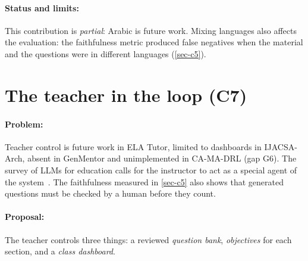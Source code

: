\paragraph{Status and limits:} This contribution is \emph{partial}:
Arabic is future work. Mixing languages also affects the evaluation: the
faithfulness metric produced false negatives when the material and the
questions were in different languages (\cref{sec-c5}).

\section[The teacher in the loop]{The teacher in the loop (C7)}
\label{sec-c6}

\paragraph{Problem:} Teacher control is future work in ELA Tutor, limited
to dashboards in IJACSA-Arch, absent in GenMentor and unimplemented in
CA-MA-DRL (gap G6). The survey of LLMs for education calls for the
instructor to act as a special agent of the system~\cite{wang2024llm4edu}.
The faithfulness measured in \cref{sec-c5} also shows that generated
questions must be checked by a human before they count.

\paragraph{Proposal:} The teacher controls three things: a reviewed
\emph{question bank}, \emph{objectives} for each section, and a
\emph{class dashboard}.

